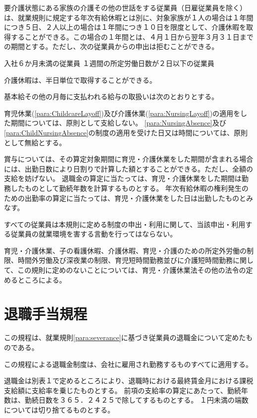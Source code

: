 \documentclass[10pt,a4paper,uplatex]{jsarticle}
\begin{document}
要介護状態にある家族の介護その他の世話をする従業員（日雇従業員を除く）は、就業規則に規定する年次有給休暇とは別に、対象家族が１人の場合は１年間につき５日、２人以上の場合は１年間につき１０日を限度として、介護休暇を取得することができる。この場合の１年間とは、４月１日から翌年３月３１日までの期間とする。ただし、次の従業員からの申出は拒むことができる。
\label{para:NursingAbsence}
\begin{enumerate}
    \itm 入社６か月未満の従業員
    \itm １週間の所定労働日数が２日以下の従業員
\end{enumerate}
\term 介護休暇は、半日単位で取得することができる。

基本給その他の月毎に支払われる給与の取扱いは次のとおりとする。
\begin{enumerate}
    \itm 育児休業(\ref{para:ChildcareLayoff})及び介護休業(\ref{para:NursingLayoff})の適用をした期間については、原則として支給しない。
    \itm \ref{para:NursingAbsence}及び\ref{para:ChildNursingAbsence}の制度の適用を受けた日又は時間については、原則として無給とする。
\end{enumerate}
\term 賞与については、その算定対象期間に育児・介護休業をした期間が含まれる場合には、出勤日数により日割りで計算した額とすることができる。ただし、全額の支給を妨げない。
\term 退職金の算定に当たっては、育児・介護休業をした期間は勤務したものとして勤続年数を計算するものとする。
\term 年次有給休暇の権利発生のための出勤率の算定に当たっては、育児・介護休業をした日は出勤したものとみなす。

すべての従業員は本規則に定める制度の申出・利用に関して、当該申出・利用する従業員の就業環境を害する言動を行ってはならない。

育児・介護休業、子の看護休暇、介護休暇、育児・介護のための所定外労働の制限、時間外労働及び深夜業の制限、育児短時間勤務並びに介護短時間勤務に関して、この規則に定めのないことについては、育児・介護休業法その他の法令の定めるところによる。


\clearpage
\section{退職手当規程}

この規程は、就業規則\ref{para:severance}に基づき従業員の退職金について定めたものである。

この規程による退職金制度は、会社に雇用され勤務するものすべてに適用する。

退職金は別表１で定めるところにより、退職時における最終賃金月における課税支給額に支給率を乗じたものとする。
\term 前項の支給率の算定にあたって、勤続年数は、勤続日数を３６５．２４２５で除してするものとする。
\term １円未満の端数については切り捨てるものとする。
\end{document}
